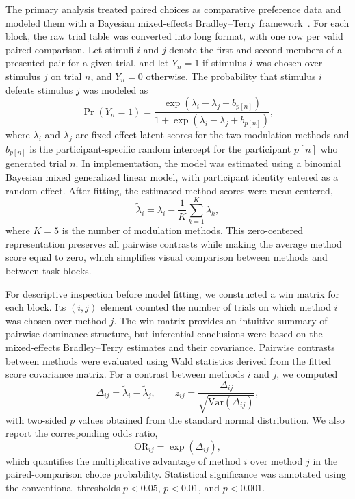 \documentclass[pdflatex, sn-nature]{sn-jnl}
\theoremstyle{thmstyleone}%
\theoremstyle{thmstyletwo}%
\theoremstyle{thmstylethree}%
\begin{document}
The primary analysis treated paired choices as comparative preference data and modeled them with a Bayesian mixed-effects Bradley--Terry framework~\citep{bradleyRankAnalysisIncomplete1952}. For each block, the raw trial table was converted into long format, with one row per valid paired comparison. Let stimuli $i$ and $j$ denote the first and second members of a presented pair for a given trial, and let $Y_{n}=1$ if stimulus $i$ was chosen over stimulus $j$ on trial $n$, and $Y_{n}=0$ otherwise. The probability that stimulus $i$ defeats stimulus $j$ was modeled as
\begin{equation}
    \Pr(Y_n=1)=\frac{\exp\left(\lambda_i-\lambda_j+b_{p[n]}\right)}{1+\exp\left(\lambda_i-\lambda_j+b_{p[n]}\right)} ,
\end{equation}
where $\lambda_i$ and $\lambda_j$ are fixed-effect latent scores for the two modulation methods and $b_{p[n]}$ is the participant-specific random intercept for the participant $p[n]$ who generated trial $n$. In implementation, the model was estimated using a binomial Bayesian mixed generalized linear model, with participant identity entered as a random effect. After fitting, the estimated method scores were mean-centered,
\begin{equation}
    \tilde{\lambda}_i = \lambda_i - \frac{1}{K}\sum_{k=1}^{K}\lambda_k,
\end{equation}
where $K=5$ is the number of modulation methods. This zero-centered representation preserves all pairwise contrasts while making the average method score equal to zero, which simplifies visual comparison between methods and between task blocks.

For descriptive inspection before model fitting, we constructed a win matrix for each block. Its $(i,j)$ element counted the number of trials on which method $i$ was chosen over method $j$. The win matrix provides an intuitive summary of pairwise dominance structure, but inferential conclusions were based on the mixed-effects Bradley--Terry estimates and their covariance. Pairwise contrasts between methods were evaluated using Wald statistics derived from the fitted score covariance matrix. For a contrast between methods $i$ and $j$, we computed
\begin{equation}
    \Delta_{ij}=\tilde{\lambda}_i-\tilde{\lambda}_j,
    \qquad
    z_{ij}=\frac{\Delta_{ij}}{\sqrt{\mathrm{Var}(\Delta_{ij})}},
\end{equation}
with two-sided $p$ values obtained from the standard normal distribution. We also report the corresponding odds ratio,
\begin{equation}
    \mathrm{OR}_{ij}=\exp(\Delta_{ij}),
\end{equation}
which quantifies the multiplicative advantage of method $i$ over method $j$ in the paired-comparison choice probability. Statistical significance was annotated using the conventional thresholds $p<0.05$, $p<0.01$, and $p<0.001$.
\end{document}
